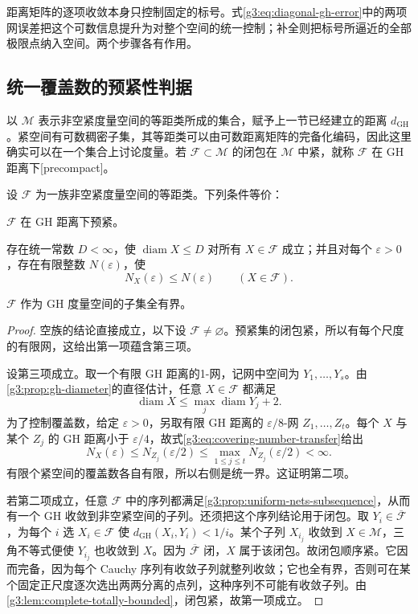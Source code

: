 距离矩阵的逐项收敛本身只控制固定的标号。式\eqref{g3:eq:diagonal-gh-error}中的两项网误差把这个可数信息提升为对整个空间的统一控制；补全则把标号所逼近的全部极限点纳入空间。两个步骤各有作用。

\subsection{统一覆盖数的预紧性判据}
\label{g3:subsec:1003:03}

以 \(\mathcal M\) 表示非空紧度量空间的等距类所成的集合，赋予上一节已经建立的距离 \(d_{\mathrm{GH}}\)。紧空间有可数稠密子集，其等距类可以由可数距离矩阵的完备化编码，因此这里确实可以在一个集合上讨论度量。若 \(\mathcal F\subset\mathcal M\) 的闭包在 \(\mathcal M\) 中紧，就称 \(\mathcal F\) 在 GH 距离下[precompact]。

\begin{theorem}\label{g3:thm:gh-precompactness}
	设 \(\mathcal F\) 为一族非空紧度量空间的等距类。下列条件等价：
	\begin{equivalences}
		\item \(\mathcal F\) 在 GH 距离下预紧。
		\item 存在统一常数 \(D<\infty\)，使 \(\operatorname{diam}X\le D\) 对所有 \(X\in\mathcal F\) 成立；并且对每个 \(\varepsilon>0\)，存在有限整数 \(N(\varepsilon)\)，使
		\[
			N_X(\varepsilon)\le N(\varepsilon)
			\qquad(X\in\mathcal F).
		\]
		\item \(\mathcal F\) 作为 GH 度量空间的子集全有界。
	\end{equivalences}
\end{theorem}
\begin{proof}
	空族的结论直接成立，以下设 \(\mathcal F\ne\varnothing\)。预紧集的闭包紧，所以有每个尺度的有限网，这给出第一项蕴含第三项。

	设第三项成立。取一个有限 GH 距离的1-网，记网中空间为 \(Y_1,\ldots,Y_s\)。由\cref{g3:prop:gh-diameter}的直径估计，任意 \(X\in\mathcal F\) 都满足
	\[
		\operatorname{diam}X\le\max_j\operatorname{diam}Y_j+2.
	\]
	为了控制覆盖数，给定 \(\varepsilon>0\)，另取有限 GH 距离的 \(\varepsilon/8\)-网 \(Z_1,\ldots,Z_t\)。每个 \(X\) 与某个 \(Z_j\) 的 GH 距离小于 \(\varepsilon/4\)，故式\eqref{g3:eq:covering-number-transfer}给出
	\[
		N_X(\varepsilon)\le N_{Z_j}(\varepsilon/2)
		\le\max_{1\le j\le t}N_{Z_j}(\varepsilon/2)<\infty.
	\]
	有限个紧空间的覆盖数各自有限，所以右侧是统一界。这证明第二项。

	若第二项成立，任意 \(\mathcal F\) 中的序列都满足\cref{g3:prop:uniform-nets-subsequence}，从而有一个 GH 收敛到非空紧空间的子列。还须把这个序列结论用于闭包。取 \(Y_i\in\overline{\mathcal F}\)，为每个 \(i\) 选 \(X_i\in\mathcal F\) 使 \(d_{\mathrm{GH}}(X_i,Y_i)<1/i\)。某个子列 \(X_{i_j}\) 收敛到 \(X\in\mathcal M\)，三角不等式便使 \(Y_{i_j}\) 也收敛到 \(X\)。因为 \(\overline{\mathcal F}\) 闭，\(X\) 属于该闭包。故闭包顺序紧。它因而完备，因为每个 Cauchy 序列有收敛子列就整列收敛；它也全有界，否则可在某个固定正尺度逐次选出两两分离的点列，这种序列不可能有收敛子列。由\cref{g3:lem:complete-totally-bounded}，闭包紧，故第一项成立。
\end{proof}

